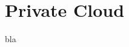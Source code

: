 \documentclass[../main.tex]{subfiles}
\begin{document}



  \section{Private Cloud}
  \label{privateCloud}
    bla



\end{document}
